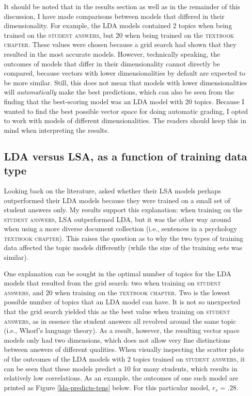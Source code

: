 \documentclass[a4paper,10pt,twoside]{article}
\begin{document}
It should be noted that in the results section as well as in the remainder of this discussion, I have made comparisons between models that differed in their dimensionality. For example, the LDA models contained 2 topics when being trained on the \textsc{student answers}, but 20 when being trained on the \textsc{textbook chapter}. These values were chosen because a grid search had shown that they resulted in the most accurate models. However, technically speaking, the outcomes of models that differ in their dimensionality cannot directly be compared, because vectors with lower dimensionalities by default are expected to be more similar. Still, this does not mean that models with lower dimensionalities will \textit{automatically} make the best predictions, which can also be seen from the finding that the best-scoring model was an LDA model with 20 topics. Because I wanted to find the best possible vector space for doing automatic grading, I opted to work with models of different dimensionalities. The readers should keep this in mind when interpreting the results.

\subsection{LDA versus LSA, as a function of training data type}
Looking back on the literature,  asked whether their LSA models perhaps outperformed their LDA models because they were trained on a small set of student answers only. My results support this explanation: when training on the \textsc{student answers}, LSA outperformed LDA, but it was the other way around when using a more diverse document collection (i.e., sentences in a psychology \textsc{textbook chapter}). This raises the question as to why the two types of training data affected the topic models differently (while the size of the training sets was similar).

One explanation can be sought in the optimal number of topics for the LDA models that resulted from the grid search: two when training on \textsc{student answers}, and 20 when training on the \textsc{textbook chapter}. Two is the lowest possible number of topics that an LDA model can have. It is not so unexpected that the grid search yielded this as the best value when training on \textsc{student answers}, as in essence the student answers all revolved around the same topic (i.e., Whorf's language theory). As a result, however, the resulting vector space models only had two dimensions, which does not allow very fine distinctions between answers of different qualities. When visually inspecting the scatter plots of the outcomes of the LDA models with 2 topics trained on \textsc{student answers}, it can be seen that these models predict a 10 for many students, which results in relatively low correlations. As an example, the outcomes of one such model are printed as Figure \ref{lda-predicts-tens} below. For this particular model, $\textit{r}_s$ = .28.
\end{document}
